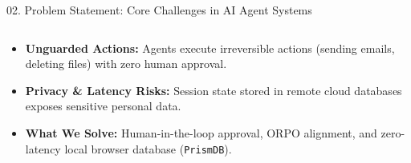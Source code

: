\documentclass[aspectratio=169,10pt]{beamer}
\begin{document}
\begin{frame}[t]{02. Problem Statement: Core Challenges in AI Agent Systems}
\begin{columns}[T]
\begin{column}{0.485\textwidth}
    \begin{tcolorbox}[
      enhanced, arc=3pt, colframe=lavenderDark!85!black, colback=white,
      title={\scriptsize\bfseries\color{white}\faLock\ 4. Safety Hazards \& Cloud Data Lock-in},
      colbacktitle=lavenderDark!85!black, boxrule=0.6pt,
      left=4pt, right=4pt, top=2.0pt, bottom=2.0pt
    ]
    \fontsize{5.5}{6.7}\selectfont
    \begin{itemize}\setlength{\itemsep}{1.2pt}
      \item \textbf{Unguarded Actions:} Agents execute irreversible actions (sending emails, deleting files) with zero human approval.
      \item \textbf{Privacy \& Latency Risks:} Session state stored in remote cloud databases exposes sensitive personal data.
      \item \textbf{\color{lavenderDark!90!black}What We Solve:} Human-in-the-loop approval, ORPO alignment, and zero-latency local browser database (\texttt{PrismDB}).
    \end{itemize}
    \end{tcolorbox}
  \end{column}
\end{columns}

\end{frame}
\end{document}
